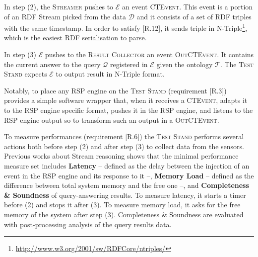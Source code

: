                                                                                                                                                                                                                                                                                                                                                                                                                                                                                                                                                                                                                                                                                                                                                                                                                                                                                                                                                                                                                                                                                                                                                                                                                                              

In step (2), the \textsc{Streamer} pushes to $\mathcal{E}$ an event \textsc{CTEvent}. This event is a portion of an RDF Stream picked from the data $\mathcal{D}$ and it consists of a set of RDF triples with the same timestamp. In order to satisfy [R.12], it sends triple in N-Triple\footnote{\url{http://www.w3.org/2001/sw/RDFCore/ntriples/}}, which is the easiest RDF serialisation to parse.  


In step (3) $\mathcal{E}$ pushes to the \textsc{Result Collector} an event \textsc{OutCTEvent}. It contains the current answer to the query $\mathcal{Q}$ registered in $\mathcal{E}$ given the ontology $\mathcal{T}$. The \textsc{Test Stand} expects $\mathcal{E}$ to output result in N-Triple format. 

Notably, to place any RSP engine on the \textsc{Test Stand} (requirement [R.3]) \name provides a simple software wrapper that, when it receives a \textsc{CTEvent}, adapts it to the RSP engine specific format, pushes it in the RSP engine, and listens to the RSP engine output so to transform such an output in a \textsc{OutCTEvent}.

To measure performances (requirement [R.6]) the \textsc{Test Stand} performs several actions both before step (2) and after step (3) to collect data from the sensors. Previous works about Stream reasoning \cite{DBLP:conf/esws/ScharrenbachUMVB13} shows that the minimal performance measure set includes \textbf{Latency} -- defined as the delay between the injection of an event in the RSP engine and its response to it --, \textbf{Memory Load} -- defined as the difference between total system memory and the free one --, and \textbf{Completeness \& Soundness} of query-answering results. To measure latency, it starts a timer before (2) and stops it after (3). To measure memory load, it asks for the free memory of the system after step (3). Completeness \& Soundness are evaluated with post-processing analysis of the query results data.

